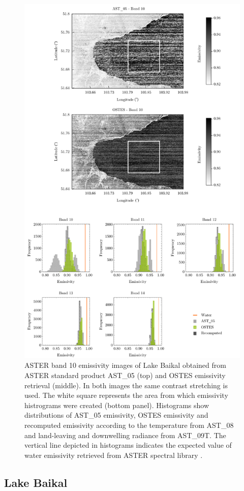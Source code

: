 \begin{figure}[!h]
\centering
\includegraphics[width=0.76\linewidth]{pics/Chapter_04/Baikal.pdf}
\vspace{1.5 em}
\caption{
ASTER band 10 emissivity images of Lake Baikal obtained from ASTER standard product AST\_05 (top) and OSTES emissivity retrieval (middle). In both images the same contrast stretching is used. The white square represents the area from which emissivity histrograms were created (bottom panel). Histograms show distributions of AST\_05 emissivity, OSTES emissivity and recomputed emissivity according to the temperature from AST\_08 and land-leaving and downwelling radiance from AST\_09T. The vertical line depicted in histograms indicates the expected value of water emissivity retrieved from ASTER spectral library \cite{BH09}.}
\label{fig:Bajkal}
\end{figure}

\subsection*{Lake Baikal}

